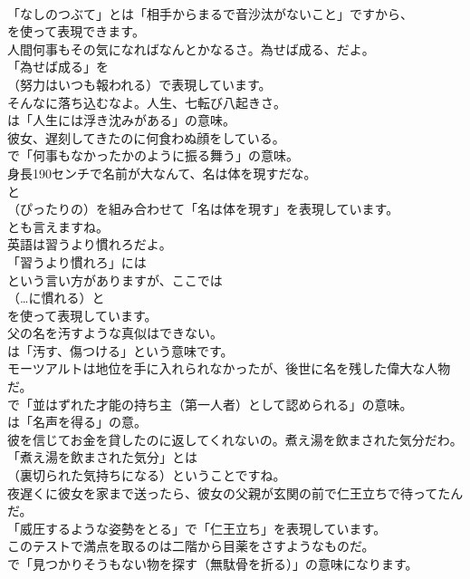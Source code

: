 \documentclass[8pt]{extreport}
\begin{document}
\begin{CJK}{UTF8}{min}
\\	「なしのつぶて」とは「相手からまるで音沙汰がないこと」ですから、
\\	を使って表現できます。	
\\	人間何事もその気になればなんとかなるさ。為せば成る、だよ。 
\\	「為せば成る」を 
\\	（努力はいつも報われる）で表現しています。	
\\	そんなに落ち込むなよ。人生、七転び八起きさ。 
\\	は「人生には浮き沈みがある」の意味。	
\\	彼女、遅刻してきたのに何食わぬ顔をしている。 
\\	で「何事もなかったかのように振る舞う」の意味。	
\\	身長190センチで名前が大なんて、名は体を現すだな。 
\\	と 
\\	（ぴったりの）を組み合わせて「名は体を現す」を表現しています。 
\\	とも言えますね。	
\\	英語は習うより慣れろだよ。 
\\	「習うより慣れろ」には 
\\	という言い方がありますが、ここでは 
\\	（…に慣れる）と 
\\	を使って表現しています。	
\\	父の名を汚すような真似はできない。 
\\	は「汚す、傷つける」という意味です。	
\\	モーツアルトは地位を手に入れられなかったが、後世に名を残した偉大な人物だ。 
\\	で「並はずれた才能の持ち主（第一人者）として認められる」の意味。
\\	は「名声を得る」の意。	
\\	彼を信じてお金を貸したのに返してくれないの。煮え湯を飲まされた気分だわ。 
\\	「煮え湯を飲まされた気分」とは 
\\	（裏切られた気持ちになる）ということですね。	
\\	夜遅くに彼女を家まで送ったら、彼女の父親が玄関の前で仁王立ちで待ってたんだ。 
\\	「威圧するような姿勢をとる」で「仁王立ち」を表現しています。	
\\	このテストで満点を取るのは二階から目薬をさすようなものだ。 
\\	で「見つかりそうもない物を探す（無駄骨を折る）」の意味になります。	

\end{CJK}
\end{document}
